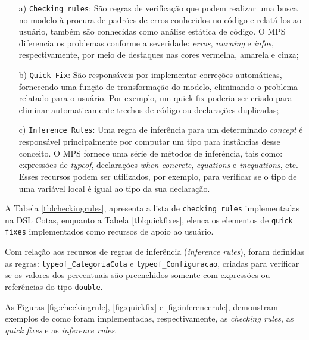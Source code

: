 \begin{enumerate}
 
 \item[a)] \texttt{Checking rules}: São regras de verificação que podem realizar uma busca no modelo à procura de padrões de erros conhecidos no código e relatá-los ao usuário, também são conhecidas como análise estática de código. O \gls{MPS} diferencia os problemas conforme a severidade: \textit{erros}, \textit{warning} e \textit{infos}, respectivamente, por meio de destaques nas cores vermelha, amarela e cinza;
 
 \item[b)]\texttt{Quick Fix}: São responsáveis por implementar correções automáticas, fornecendo uma função de transformação do modelo, eliminando o problema relatado para o usuário. Por exemplo, um quick fix poderia ser criado para eliminar automaticamente trechos de código ou declarações duplicadas;
 
 \item[c)]\texttt{Inference Rules}: Uma regra de inferência para um determinado \textit{concept} é responsável principalmente por computar um tipo para instâncias desse conceito. O \gls{MPS} fornece uma série de métodos de inferência, tais como: expressões de \textit{typeof}, declarações \textit{when concrete}, \textit{equations} e \textit{inequations}, etc. Esses recursos podem ser utilizados, por exemplo, para verificar se o tipo de uma variável local é igual ao tipo da sua declaração.
\end{enumerate}


A Tabela \ref{tblcheckingrules}, apresenta a lista de \texttt{checking rules} implementadas na DSL Cotas, enquanto a Tabela \ref{tblquickfixes}, elenca os elementos de \texttt{quick fixes} implementados como recursos de apoio ao usuário.



\newpage



Com relação aos recursos de regras de inferência (\textit{inference rules}), foram definidas as regras: \texttt{typeof\_CategoriaCota} e \texttt{typeof\_Configuracao}, criadas para verificar se os valores dos percentuais são preenchidos somente com expressões ou referências do tipo \texttt{double}.

As Figuras \ref{fig:checkingrule}, \ref{fig:quickfix} e \ref{fig:inferencerule}, demonstram exemplos de como foram implementadas, respectivamente, as \textit{checking rules}, as \textit{quick fixes} e as \textit{inference rules}. 



